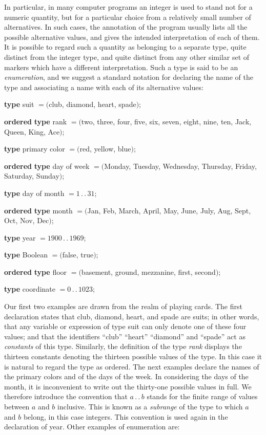 In particular, in many computer programs an integer is used to stand not for a numeric quantity, but for a particular choice from a relatively small number of alternatives. In such cases, the annotation of the program usually lists all the possible alternative values, and gives the intended interpretation of each of them. It is possible to regard such a quantity as belonging to a separate type, quite distinct from the integer type, and quite distinct from any other similar set of markers which have a different interpretation. Such a type is said to be an \textit{enumeration}, and we suggest a standard notation for declaring the name of the type and associating a name with each of its alternative values:
\medskip

\tabto{3.7em}\textbf{type} suit $= ($club, diamond, heart, spade$)$;

\noindent
{}\parindent\textbf{ordered} \tabto{3.7em}\textbf{type} rank $= ($two, three, four, five, six, seven, eight, nine, ten, Jack, Queen, King, Ace$)$;
\medskip

\tabto{3.7em}\textbf{type} primary color $= ($red, yellow, blue$)$;

\noindent
{}\parindent\textbf{ordered} \tabto{3.7em}\textbf{type} day of week $= ($Monday, Tuesday, Wednesday, Thursday, Friday, Saturday, Sunday$)$;
\medskip

\tabto{3.7em}\textbf{type} day of month $= 1\,.\,.\,31$;

\noindent
{}\parindent\textbf{ordered} \tabto{3.7em}\textbf{type} month $= ($Jan, Feb, March, April, May, June, July, Aug, Sept, Oct, Nov, Dec$)$;
\medskip

\tabto{3.7em}\textbf{type} year $= 1900\,.\,.\,1969$;

\tabto{3.7em}\textbf{type} Boolean $= ($false, true$)$;
\medskip

\noindent
{}\parindent\textbf{ordered} \tabto{3.7em}\textbf{type} floor $= ($basement, ground, mezzanine, first, second$)$;

\tabto{3.7em}\textbf{type} coordinate $= 0\,.\,.\,1023$;
\medskip

Our first two examples are drawn from the realm of playing cards. The first declaration states that club, diamond, heart, and spade are suits; in other words, that any variable or expression of type suit can only denote one of these four values; and that the identifiers ``club'' ``heart'' ``diamond'' and ``spade'' act as \textit{constants} of this type. Similarly, the definition of the type \textit{rank} displays the thirteen constants denoting the thirteen possible values of the type. In this case it is natural to regard the type as ordered. The next examples declare the names of the primary colors and of the days of the week. In considering the days of the month, it is inconvenient to write out the thirty-one possible values in full. We therefore introduce the convention that $a\,.\,.\,b$ stands for the finite range of values between $a$ and $b$ inclusive. This is known as a \textit{subrange} of the type to which $a$ and $b$ belong, in this case integers. This convention is used again in the declaration of year. Other examples of enumeration are:

